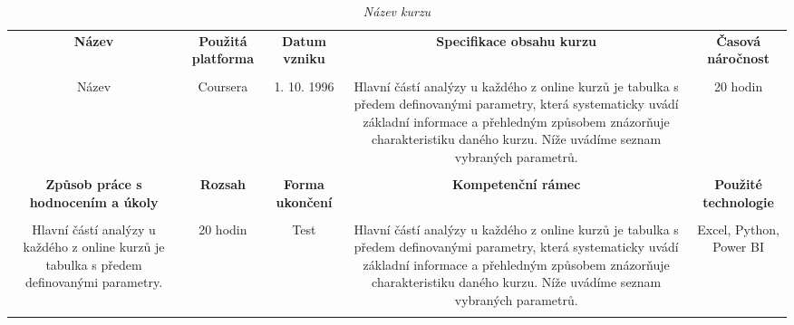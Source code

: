 \begin{landscape}
\begin{table}[htbp]
  \renewcommand\thetable{1}
  \caption{\textit{Název kurzu}}\label{tab1}
  \scriptsize
  {
    \justifying
    \begin{tabularx}{\linewidth}{CCCCC}
      \toprule
     
      \textbf{Název} &
      \textbf{Použitá platforma} &
      \textbf{Datum vzniku} &
      \textbf{Specifikace obsahu kurzu} &
      \textbf{Časová náročnost}  \\
      
      \tabularnewline
      \midrule
      
        Název &
        Coursera &
        1. 10. 1996 &
        Hlavní částí analýzy u každého z online kurzů je tabulka s předem definovanými parametry, která systematicky uvádí základní informace a přehledným způsobem znázorňuje charakteristiku daného kurzu. Níže uvádíme seznam vybraných parametrů.&
        20 hodin \\
        
              \tabularnewline

      \toprule

        \textbf{Způsob práce s hodnocením a úkoly} &
        \textbf{Rozsah} &
        \textbf{Forma ukončení} &
        \textbf{Kompetenční rámec} &
        \textbf{Použité technologie} \\
      
        \tabularnewline
      \midrule
      
        Hlavní částí analýzy u každého z online kurzů je tabulka s předem definovanými parametry. &
        20 hodin &
        Test &
        Hlavní částí analýzy u každého z online kurzů je tabulka s předem definovanými parametry, která systematicky uvádí základní informace a přehledným způsobem znázorňuje charakteristiku daného kurzu. Níže uvádíme seznam vybraných parametrů.&
        Excel, Python, Power BI \\

        \tabularnewline
      \bottomrule
    \end{tabularx}
  }
\end{table}
\end{landscape}